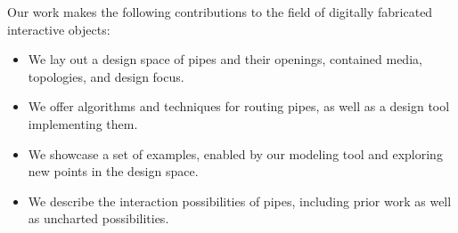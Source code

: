 Our work makes the following contributions to the field of digitally fabricated interactive objects:

\begin{itemize}
\item We lay out a design space of pipes and their openings, contained media, topologies, and design focus.
\item We offer algorithms and techniques for routing pipes, as well as a design tool implementing them.
\item We showcase a set of examples, enabled by our modeling tool and exploring new points in the design space.
\item We describe the interaction possibilities of pipes, including prior work as well as uncharted possibilities.
\end{itemize}